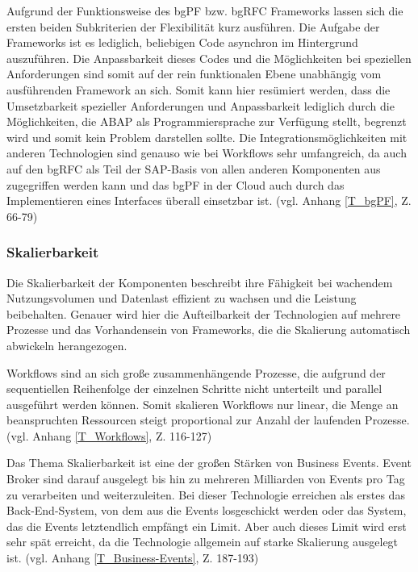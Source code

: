 Aufgrund der Funktionsweise des bgPF bzw. bgRFC Frameworks lassen sich die ersten beiden Subkriterien der Flexibilität kurz ausführen. Die Aufgabe der Frameworks ist es lediglich, beliebigen Code asynchron im Hintergrund auszuführen. Die Anpassbarkeit dieses Codes und die Möglichkeiten bei speziellen Anforderungen sind somit auf der rein funktionalen Ebene unabhängig vom ausführenden Framework an sich. Somit kann hier resümiert werden, dass die Umsetzbarkeit spezieller Anforderungen und Anpassbarkeit lediglich durch die Möglichkeiten, die ABAP als Programmiersprache zur Verfügung stellt, begrenzt wird und somit kein Problem darstellen sollte. Die Integrationsmöglichkeiten mit anderen Technologien sind genauso wie bei Workflows sehr umfangreich, da auch auf den bgRFC als Teil der SAP-Basis von allen anderen Komponenten aus zugegriffen werden kann und das bgPF in der Cloud auch durch das Implementieren eines Interfaces überall einsetzbar ist. (vgl. Anhang \ref{T_bgPF}, Z. 66-79)

\subsubsection{Skalierbarkeit}

Die Skalierbarkeit der Komponenten beschreibt ihre Fähigkeit bei wachendem Nutzungsvolumen und Datenlast effizient zu wachsen und die Leistung beibehalten. Genauer wird hier die Aufteilbarkeit der Technologien auf mehrere Prozesse und das Vorhandensein von Frameworks, die die Skalierung automatisch abwickeln herangezogen.

Workflows sind an sich gro{\ss}e zusammenhängende Prozesse, die aufgrund der sequentiellen Reihenfolge der einzelnen Schritte nicht unterteilt und \zB parallel ausgeführt werden können. Somit skalieren Workflows nur linear, die Menge an beanspruchten Ressourcen steigt proportional zur Anzahl der laufenden Prozesse. (vgl. Anhang \ref{T_Workflows}, Z. 116-127)

Das Thema Skalierbarkeit ist eine der gro{\ss}en Stärken von Business Events. Event Broker sind darauf ausgelegt bis hin zu mehreren Milliarden von Events pro Tag zu verarbeiten und weiterzuleiten. Bei dieser Technologie erreichen als erstes das Back-End-System, von dem aus die Events losgeschickt werden oder das System, das die Events letztendlich empfängt ein Limit. Aber auch dieses Limit wird erst sehr spät erreicht, da die Technologie allgemein auf starke Skalierung ausgelegt ist. (vgl. Anhang \ref{T_Business-Events}, Z. 187-193)

